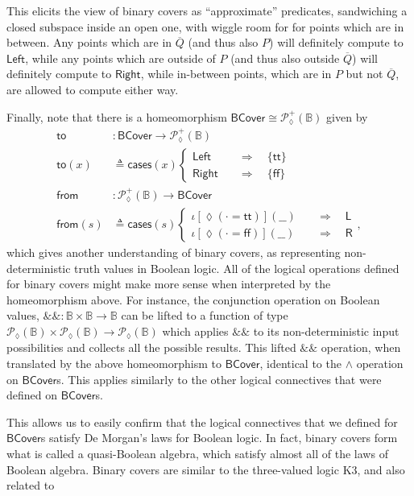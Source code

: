 \documentclass[conference]{IEEEtran}
\newcommand{\PLower}{\mathcal{P}_\lozenge}
\newcommand{\bool}{\mathbb{B}}
\newcommand{\wildcard}{\_\_}
\newcommand{\oinclf}[1]{\iota[{#1}]}
\newcommand{\oincl}[2]{\oinclf{#1} \left({#2}\right)}
\newcommand{\Branch}{\Rightarrow}
\begin{document}
This elicits the view of binary covers as ``approximate'' predicates, sandwiching a closed subspace inside an open one, with wiggle room for for points which are in between. Any points which are in $\overline{Q}$ (and thus also $P$) will definitely compute to $\mathsf{Left}$, while any points which are outside of $P$ (and thus also outside $\overline{Q}$) will definitely compute to $\mathsf{Right}$, while in-between points, which are in $P$ but not $\overline{Q}$, are allowed to compute either way.

Finally, note that there is a homeomorphism $\mathsf{BCover} \cong \PLower^+(\bool)$ given by
\begin{align*}
\mathsf{to} &: \mathsf{BCover} \to \PLower^+(\bool)
\\ \mathsf{to}(x) &\triangleq
  \mathsf{cases}(x)
  \begin{cases}
\mathsf{Left}
 \quad &\Branch \quad
 \{ \mathsf{tt} \}
\\
\mathsf{Right}
 \quad &\Branch \quad
 \{ \mathsf{ff} \}
  \end{cases}
\\
\mathsf{from} &: \PLower^+(\bool) \to \mathsf{BCover}
\\ \mathsf{from}(s) &\triangleq
  \mathsf{cases}(s)
  \begin{cases}
 \oincl{\lozenge(\cdot = \mathsf{tt})}{\wildcard}
 \quad &\Branch \quad
 \mathsf{L}
\\
 \oincl{\lozenge(\cdot = \mathsf{ff})}{\wildcard}
 \quad &\Branch \quad
 \mathsf{R}
  \end{cases},
\end{align*}
which gives another understanding of binary covers, as representing non-deterministic truth values in Boolean logic. All of the logical operations defined for binary covers might make more sense when interpreted by the homeomorphism above. For instance, the conjunction operation on Boolean values,
$\&\& : \bool \times \bool \to \bool$ can be lifted to a function of type $\PLower(\bool) \times \PLower(\bool) \to \PLower(\bool)$ which applies $\&\&$ to its non-deterministic input possibilities and collects all the possible results. This lifted $\&\&$ operation, when translated by the above homeomorphism to $\mathsf{BCover}$, identical to the $\wedge$ operation on $\mathsf{BCover}$s. This applies similarly to the other logical connectives that were defined on $\mathsf{BCover}$s.

This allows us to easily confirm that the logical connectives that we defined for $\mathsf{BCover}$s satisfy  De Morgan's laws for Boolean logic. In fact, binary covers form what is called a quasi-Boolean algebra, which satisfy almost all of the laws of Boolean algebra. Binary covers are similar to the three-valued logic K3, and also related to 
\end{document}
